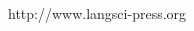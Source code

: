 \documentclass[final,utf8]{beamer}
\begin{document}
\begin{frame}{}
\begin{columns}[t]
\begin{column}{.45\linewidth}
\begin{block}{http://www.langsci-press.org}
\begin{center}
      \end{center} 
    \end{block}
       
  \end{column}
\end{columns}
\vfill
\end{frame}
\end{document}
